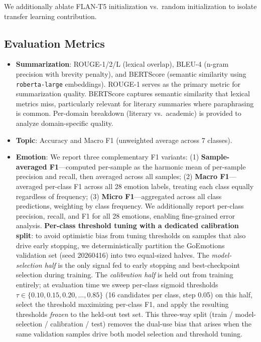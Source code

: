 \documentclass[11pt]{article}
\begin{document}
We additionally ablate FLAN-T5 initialization vs.\ random initialization to isolate transfer learning contribution.

\subsection{Evaluation Metrics}

\begin{itemize}
    \item \textbf{Summarization}: ROUGE-1/2/L \citep{lin2004rouge} (lexical overlap), BLEU-4 (n-gram precision with brevity penalty), and BERTScore \citep{zhang2019bertscore} (semantic similarity using \texttt{roberta-large} embeddings). ROUGE-1 serves as the primary metric for summarization quality. BERTScore captures semantic similarity that lexical metrics miss, particularly relevant for literary summaries where paraphrasing is common. Per-domain breakdown (literary vs.\ academic) is provided to analyze domain-specific quality.
    \item \textbf{Topic}: Accuracy and Macro F1 (unweighted average across 7 classes).
    \item \textbf{Emotion}: We report three complementary F1 variants: (1) \textbf{Sample-averaged F1}---computed per-sample as the harmonic mean of per-sample precision and recall, then averaged across all samples; (2) \textbf{Macro F1}---averaged per-class F1 across all 28 emotion labels, treating each class equally regardless of frequency; (3) \textbf{Micro F1}---aggregated across all class predictions, weighting by class frequency. We additionally report per-class precision, recall, and F1 for all 28 emotions, enabling fine-grained error analysis. \textbf{Per-class threshold tuning with a dedicated calibration split}: to avoid optimistic bias from tuning thresholds on samples that also drive early stopping, we deterministically partition the GoEmotions validation set (seed 20260416) into two equal-sized halves. The \emph{model-selection half} is the only signal fed to early stopping and best-checkpoint selection during training. The \emph{calibration half} is held out from training entirely; at evaluation time we sweep per-class sigmoid thresholds $\tau \in \{0.10, 0.15, 0.20, \ldots, 0.85\}$ (16 candidates per class, step 0.05) on this half, select the threshold maximizing per-class F1, and apply the resulting thresholds \textit{frozen} to the held-out test set. This three-way split (train / model-selection / calibration / test) removes the dual-use bias that arises when the same validation samples drive both model selection and threshold tuning.
\end{itemize}
\end{document}
